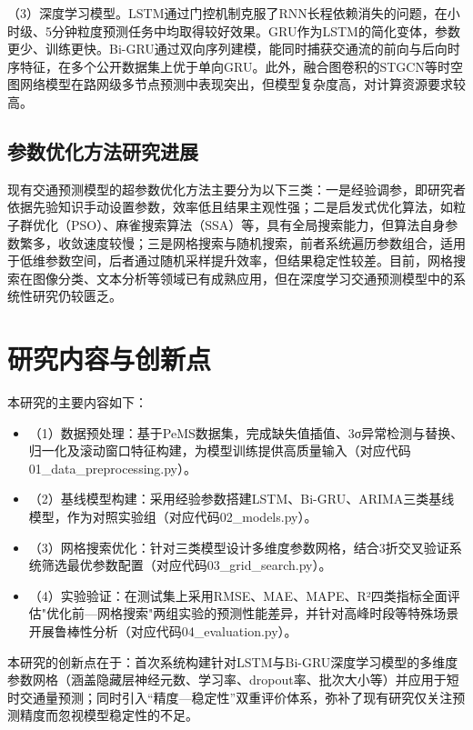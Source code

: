 \documentclass[12pt,a4paper,oneside]{ctexbook}
\begin{document}
	（3）深度学习模型。LSTM通过门控机制克服了RNN长程依赖消失的问题，在小时级、5分钟粒度预测任务中均取得较好效果\cite{polson2017,wang2021}。GRU作为LSTM的简化变体，参数更少、训练更快\cite{ma2025}。Bi-GRU通过双向序列建模，能同时捕获交通流的前向与后向时序特征，在多个公开数据集上优于单向GRU\cite{yang2021,naheliya2024}。此外，融合图卷积的STGCN等时空图网络模型在路网级多节点预测中表现突出，但模型复杂度高，对计算资源要求较高\cite{zhao2025,zhai2025}。
	
	\subsection{参数优化方法研究进展}
	现有交通预测模型的超参数优化方法主要分为以下三类：一是经验调参，即研究者依据先验知识手动设置参数，效率低且结果主观性强\cite{lou2025,wang2022}；二是启发式优化算法，如粒子群优化（PSO）、麻雀搜索算法（SSA）等，具有全局搜索能力，但算法自身参数繁多，收敛速度较慢\cite{ma2025,naheliya2024}；三是网格搜索与随机搜索，前者系统遍历参数组合，适用于低维参数空间，后者通过随机采样提升效率，但结果稳定性较差\cite{lan2023,pems2025}。目前，网格搜索在图像分类、文本分析等领域已有成熟应用，但在深度学习交通预测模型中的系统性研究仍较匮乏。
	
	\section{研究内容与创新点}
	本研究的主要内容如下：
	\begin{itemize}
		\item （1）数据预处理：基于PeMS数据集，完成缺失值插值、3σ异常检测与替换、归一化及滚动窗口特征构建，为模型训练提供高质量输入（对应代码01\_data\_preprocessing.py）。
		\item （2）基线模型构建：采用经验参数搭建LSTM、Bi-GRU、ARIMA三类基线模型，作为对照实验组（对应代码02\_models.py）。
		\item （3）网格搜索优化：针对三类模型设计多维度参数网格，结合3折交叉验证系统筛选最优参数配置（对应代码03\_grid\_search.py）。
		\item （4）实验验证：在测试集上采用RMSE、MAE、MAPE、R²四类指标全面评估"优化前—网格搜索"两组实验的预测性能差异，并针对高峰时段等特殊场景开展鲁棒性分析（对应代码04\_evaluation.py）。
	\end{itemize}
	
	本研究的创新点在于：首次系统构建针对LSTM与Bi-GRU深度学习模型的多维度参数网格（涵盖隐藏层神经元数、学习率、dropout率、批次大小等）并应用于短时交通量预测；同时引入“精度—稳定性”双重评价体系，弥补了现有研究仅关注预测精度而忽视模型稳定性的不足。
	
\end{document}
